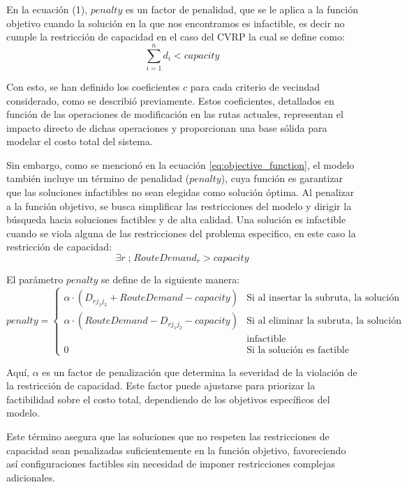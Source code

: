 \documentclass{article}
\begin{document}
En la ecuación (1), $penalty$ es un factor de penalidad, que se le aplica a la función objetivo cuando la solución en la que nos encontramos es infactible, es decir no cumple la restricción de capacidad en el caso del CVRP la cual se define como:
\begin{equation}
\sum \limits_{i=1}^{n} d_i < capacity
\end{equation}

Con esto, se han definido los coeficientes $c$ para cada criterio de vecindad considerado, como se describió previamente. Estos coeficientes, detallados en función de las operaciones de modificación en las rutas actuales, representan el impacto directo de dichas operaciones y proporcionan una base sólida para modelar el costo total del sistema. 

Sin embargo, como se mencionó en la ecuación \ref{eq:objective_function}, el modelo también incluye un término de penalidad ($penalty$), cuya función es garantizar que las soluciones infactibles  no sean elegidas como solución óptima. Al penalizar a la función objetivo, se busca simplificar las restricciones del modelo y dirigir la búsqueda hacia soluciones factibles y de alta calidad. Una solución es infactible cuando se viola alguna de las restricciones del problema especifico, en este caso la restricción de capacidad:
\[
\exists r \; \text{;} \; RouteDemand_r > capacity 
\]

El parámetro $penalty$ se define de la siguiente manera:
\[
penalty = 
\begin{cases}
    \alpha \cdot  (D_{rj_1j_2} + RouteDemand - capacity) & \text{Si al insertar la subruta, la solución es infactible} \\
    \alpha \cdot (RouteDemand - D_{rj_1j_2} - capacity) & \text{Si al eliminar la subruta, la solución continua siendo}\\ 
	& \text{infactible}\\
    0 & \text{Si la solución es factible} 
\end{cases}
\]

Aquí, $\alpha$ es un factor de penalización que determina la severidad de la violación de la restricción de capacidad. Este factor puede ajustarse para priorizar la factibilidad sobre el costo total, dependiendo de los objetivos específicos del modelo.

Este término asegura que las soluciones que no respeten las restricciones de capacidad sean penalizadas suficientemente en la función objetivo, favoreciendo así configuraciones factibles sin necesidad de imponer restricciones complejas adicionales.

\newpage

 
\end{document}
